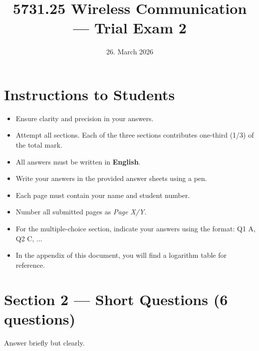 \documentclass[11pt,a4paper]{article}
\begin{document}
\pagestyle{fancy}
\fancyhf{}
\renewcommand{\headrulewidth}{0pt}
\renewcommand{\footrulewidth}{0pt}
\fancyfoot[R]{\thepage/\pageref{LastPage}}
\fancypagestyle{plain}{
    \fancyhf{}
    \fancyfoot[R]{\thepage/\pageref{LastPage}}
    \renewcommand{\headrulewidth}{0pt}
    \renewcommand{\footrulewidth}{0pt}
}

\title{5731.25 Wireless Communication --- Trial Exam 2}
\date{26. March 2026}
\maketitle

\section*{Instructions to Students}
\begin{itemize}
    \item Ensure clarity and precision in your answers.
    \item Attempt all sections. Each of the three sections contributes one-third (1/3) of the total mark.
    \item All answers must be written in \textbf{English}.
    \item Write your answers in the provided answer sheets using a pen.
    \item Each page must contain your name and student number.
    \item Number all submitted pages as \textit{Page X/Y}.
    \item For the multiple-choice section, indicate your answers using the format: Q1 A, Q2 C, ...
    \item In the appendix of this document, you will find a logarithm table for reference.
\end{itemize}

\newpage

\newpage

\section*{Section 2 --- Short Questions (6 questions)}
Answer briefly but clearly.
\end{document}
